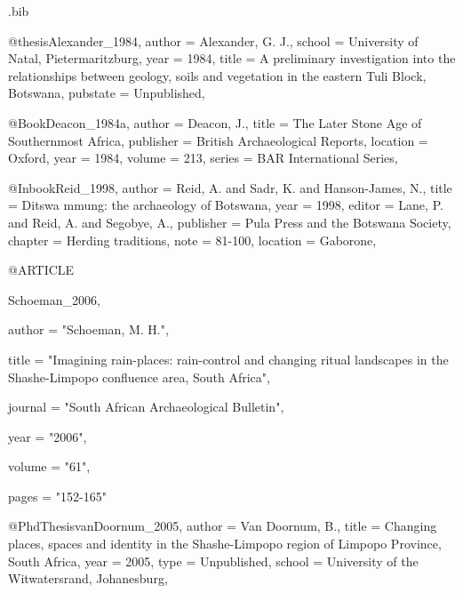 \def\identifier{\currfilebase}

\def\shorttitle{Late Holocine Rockshelter, Botswana}
\def\maintitle{The Late Holocene Occupation of Mafunyane Shelter, Eastern Botswana}
\def\shortauthor{Tim Forssman}
\def\authormail{tim.forssman@gmail.com}
\def\affiliation{University of the Witwatersrand (South Africa)}
\def\thanknote{Postdoctoral Researcher at the Rock Art Research Institute, School of Geography, Archaeology and Environmental Studies,; This paper is the product of DPhil research carried out at the University of Oxford (UK)}


\begin{filecontents}{\identifier.bib}

@thesis{Alexander_1984,
  author = {Alexander, G. J.},
  school = {University of Natal, Pietermaritzburg},
  year   = {1984},
  title  = {A preliminary investigation into the relationships between geology, soils and vegetation in the eastern Tuli Block, Botswana},
  pubstate   = {Unpublished},
}

@Book{Deacon_1984a,
  author    = {Deacon, J.},
  title     = {The Later Stone Age of Southernmost Africa},
  publisher = {British Archaeological Reports},
  location  = {Oxford},
  year      = {1984},
  volume    = {213},
  series    = {BAR International Series},
}

@Inbook{Reid_1998,
  author    = {Reid, A. and Sadr, K. and Hanson-James, N.},
  title     = {Ditswa mmung: the archaeology of Botswana},
  year      = {1998},
  editor    = {Lane, P. and Reid, A. and Segobye, A.},
  publisher = {Pula Press and the Botswana Society},
  chapter   = {Herding traditions},
  note      = {81-100},
  location  = {Gaborone},
}


@ARTICLE {Schoeman_2006,

author  = "Schoeman, M. H.",

title   = "Imagining rain-places: rain-control and changing ritual landscapes in the Shashe-Limpopo confluence area, South Africa",

journal = "South African Archaeological Bulletin",

year    = "2006",

volume  = "61",

pages   = "152-165"

}

@PhdThesis{vanDoornum_2005,
  author = {Van Doornum, B.},
  title  = {Changing places, spaces and identity in the Shashe-Limpopo region of Limpopo Province, South Africa},
  year   = {2005},
  type   = {Unpublished},
  school = {University of the Witwatersrand, Johanesburg},
}


\end{filecontents}
